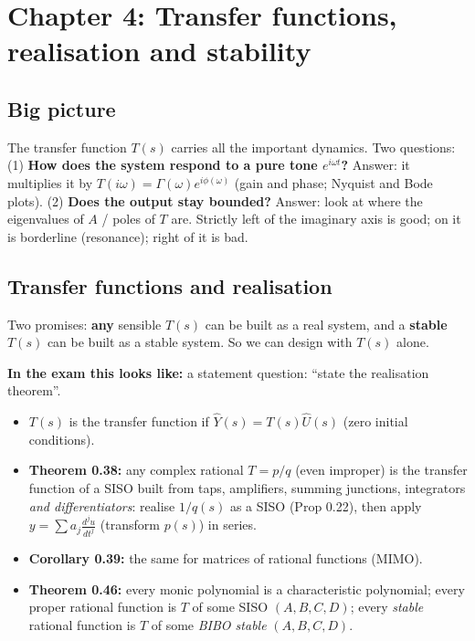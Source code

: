 \section{Chapter 4: Transfer functions, realisation and stability \texorpdfstring{}{}}
\label{ch4}

\subsection*{Big picture}
The transfer function $T(s)$ carries all the important dynamics. Two questions:
(1) \textbf{How does the system respond to a pure tone $e^{i\omega t}$?} Answer: it multiplies it by $T(i\omega)=\Gamma(\omega)e^{i\phi(\omega)}$ (gain and phase; Nyquist and Bode plots).
(2) \textbf{Does the output stay bounded?} Answer: look at where the eigenvalues of $A$ / poles of $T$ are. Strictly left of the imaginary axis is good; on it is borderline (resonance); right of it is bad.

\subsection{Transfer functions and realisation \texorpdfstring{}{}}\label{ss:4-1}
\begin{plainbox}
Two promises: \textbf{any} sensible $T(s)$ can be built as a real system, and a \textbf{stable} $T(s)$ can be built as a stable system.
So we can design with $T(s)$ alone.
\par\smallskip\textbf{In the exam this looks like:} a statement question: ``state the realisation theorem''.
\end{plainbox}
\begin{thmbox}
\begin{itemize}
\item $T(s)$ is the transfer function if $\hat Y(s)=T(s)\hat U(s)$ (zero initial conditions).
\item \textbf{Theorem 0.38:} any complex rational $T=p/q$ (even improper) is the transfer function of a SISO built from taps, amplifiers, summing junctions, integrators \emph{and differentiators}:
realise $1/q(s)$ as a SISO (Prop 0.22), then apply $y=\sum a_j\frac{d^ju}{dt^j}$ (transform $p(s)$) in series.
\item \textbf{Corollary 0.39:} the same for matrices of rational functions (MIMO).
\item \textbf{Theorem 0.46:} every monic polynomial is a characteristic polynomial; every proper rational function is $T$ of some SISO $(A,B,C,D)$; every \emph{stable} rational function is $T$ of some \emph{BIBO stable} $(A,B,C,D)$.
\end{itemize}
\end{thmbox}

